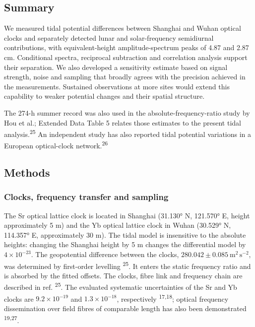 \documentclass[
  11pt,
  a4paper,
]{article}
\begin{document}
\hypertarget{summary}{%
\subsection{Summary}\label{summary}}

We measured tidal potential differences between Shanghai and Wuhan
optical clocks and separately detected lunar and solar-frequency
semidiurnal contributions, with equivalent-height amplitude-spectrum
peaks of 4.87 and 2.87 cm. Conditional spectra, reciprocal subtraction
and correlation analysis support their separation. We also developed a
sensitivity estimate based on signal strength, noise and sampling that
broadly agrees with the precision achieved in the measurements.
Sustained observations at more sites would extend this capability to
weaker potential changes and their spatial structure.

The 274-h summer record was also used in the absolute-frequency-ratio
study by Hou et al.; Extended Data Table 5 relates those estimates to
the present tidal analysis.\textsuperscript{25} An independent study has
also reported tidal potential variations in a European optical-clock
network.\textsuperscript{26}

\hypertarget{methods}{%
\subsection{Methods}\label{methods}}

\hypertarget{clocks-frequency-transfer-and-sampling}{%
\subsubsection{Clocks, frequency transfer and
sampling}\label{clocks-frequency-transfer-and-sampling}}

The Sr optical lattice clock is located in Shanghai (31.130° N, 121.570°
E, height approximately 5 m) and the Yb optical lattice clock in Wuhan
(30.529° N, 114.357° E, approximately 30 m). The tidal model is
insensitive to the absolute heights: changing the Shanghai height by 5 m
changes the differential model by \(4\times10^{-23}\). The geopotential
difference between the clocks,
\(280.042\pm0.085\ \mathrm{m^2\,s^{-2}}\), was determined by first-order
levelling \textsuperscript{25}. It enters the static frequency ratio and
is absorbed by the fitted offsets. The clocks, fibre link and frequency
chain are described in ref. \textsuperscript{25}. The evaluated
systematic uncertainties of the Sr and Yb clocks are
\(9.2\times10^{-19}\) and \(1.3\times10^{-18}\), respectively
\textsuperscript{17,18}; optical frequency dissemination over field
fibres of comparable length has also been demonstrated
\textsuperscript{19,27}.
\end{document}
